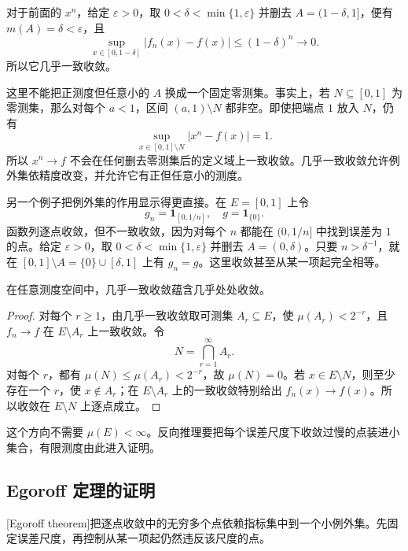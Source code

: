 \ProseParagraphBreak

对于前面的 \(x^n\)，给定 \(\varepsilon>0\)，取 \(0<\delta<\min\{1,\varepsilon\}\) 并删去 \(A=(1-\delta,1]\)，便有 \(m(A)=\delta<\varepsilon\)，且
\[
\sup_{x\in[0,1-\delta]}|f_n(x)-f(x)|
\leq(1-\delta)^n\longrightarrow0.
\]
所以它几乎一致收敛。

\ProseParagraphBreak

这里不能把正测度但任意小的 \(A\) 换成一个固定零测集。事实上，若
\(N\subseteq[0,1]\) 为零测集，那么对每个 \(a<1\)，区间
\((a,1)\setminus N\) 都非空。即使把端点 \(1\) 放入 \(N\)，仍有
\[
\sup_{x\in[0,1]\setminus N}|x^n-f(x)|=1.
\]
所以 \(x^n\to f\) 不会在任何删去零测集后的定义域上一致收敛。几乎一致收敛允许例外集依精度改变，并允许它有正但任意小的测度。

\ProseParagraphBreak

另一个例子把例外集的作用显示得更直接。在 \(E=[0,1]\) 上令
\[
g_n=\mathbf 1_{[0,1/n]},
\quad
g=\mathbf 1_{\{0\}}.
\]
函数列逐点收敛，但不一致收敛，因为对每个 \(n\) 都能在
\((0,1/n]\) 中找到误差为 \(1\) 的点。给定 \(\varepsilon>0\)，取
\(0<\delta<\min\{1,\varepsilon\}\) 并删去 \(A=(0,\delta)\)。只要
\(n>\delta^{-1}\)，就在
\([0,1]\setminus A=\{0\}\cup[\delta,1]\) 上有 \(g_n=g\)。这里收敛甚至从某一项起完全相等。

\begin{proposition}
\label{b1:prop:almost-uniform-implies-ae}
在任意测度空间中，几乎一致收敛蕴含几乎处处收敛。
\end{proposition}
\begin{proof}
对每个 \(r\geq1\)，由几乎一致收敛取可测集
\(A_r\subseteq E\)，使 \(\mu(A_r)<2^{-r}\)，且
\(f_n\to f\) 在 \(E\setminus A_r\) 上一致收敛。令
\[
N=\bigcap_{r=1}^{\infty}A_r.
\]
对每个 \(r\)，都有 \(\mu(N)\leq\mu(A_r)<2^{-r}\)，故
\(\mu(N)=0\)。若 \(x\in E\setminus N\)，则至少存在一个 \(r\)，使
\(x\notin A_r\)；在 \(E\setminus A_r\) 上的一致收敛特别给出
\(f_n(x)\to f(x)\)。所以收敛在 \(E\setminus N\) 上逐点成立。
\end{proof}

这个方向不需要 \(\mu(E)<\infty\)。反向推理要把每个误差尺度下收敛过慢的点装进小集合，有限测度由此进入证明。

\subsection{Egoroff 定理的证明}
\label{b1:subsec:040503}

[Egoroff theorem]把逐点收敛中的无穷多个点依赖指标集中到一个小例外集。先固定误差尺度，再控制从某一项起仍然违反该尺度的点。

